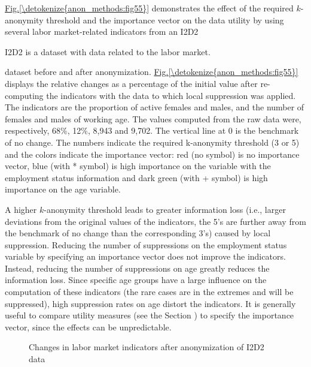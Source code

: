 \documentclass[letterpaper,10pt,english]{sphinxmanual}
\begin{document}
\hyperref[\detokenize{anon_methods:fig55}]{Fig.\@ \ref{\detokenize{anon_methods:fig55}}} demonstrates the effect of the required \(k\)-anonymity
threshold and the importance vector on the data utility by using several
labor market-related indicators from an I2D2 %
\begin{footnote}[8]\sphinxAtStartFootnote
I2D2 is a dataset with data related to the labor market.
%
\end{footnote}
dataset before and after anonymization. \hyperref[\detokenize{anon_methods:fig55}]{Fig.\@ \ref{\detokenize{anon_methods:fig55}}} displays the relative
changes as a percentage of the initial value after re-computing the
indicators with the data to which local suppression was applied. The
indicators are the proportion of active females and males, and the
number of females and males of working age. The values computed from the
raw data were, respectively, 68\%, 12\%, 8,943 and 9,702. The vertical
line at 0 is the benchmark of no change. The numbers indicate the
required k-anonymity threshold (3 or 5) and the colors indicate the
importance vector: red (no symbol) is no importance vector, blue (with
* symbol) is high importance on the variable with the employment status
information and dark green (with + symbol) is high importance on the age
variable.

A higher \(k\)-anonymity threshold leads to greater information loss
(i.e., larger deviations from the original values of the indicators, the
5’s are further away from the benchmark of no change than the
corresponding 3’s) caused by local suppression. Reducing the number of
suppressions on the employment status variable by specifying an
importance vector does not improve the indicators. Instead, reducing the
number of suppressions on age greatly reduces the information loss.
Since specific age groups have a large influence on the computation of
these indicators (the rare cases are in the extremes and will be
suppressed), high suppression rates on age distort the indicators. It is
generally useful to compare utility measures (see the Section
 ) to specify
the importance vector, since the effects can be unpredictable.

\begin{figure}[htbp]
\centering
\capstart

\noindent{}
\caption{Changes in labor market indicators after anonymization of I2D2 data}\label{\detokenize{anon_methods:fig55}}\label{\detokenize{anon_methods:id33}}\end{figure}
\end{document}
